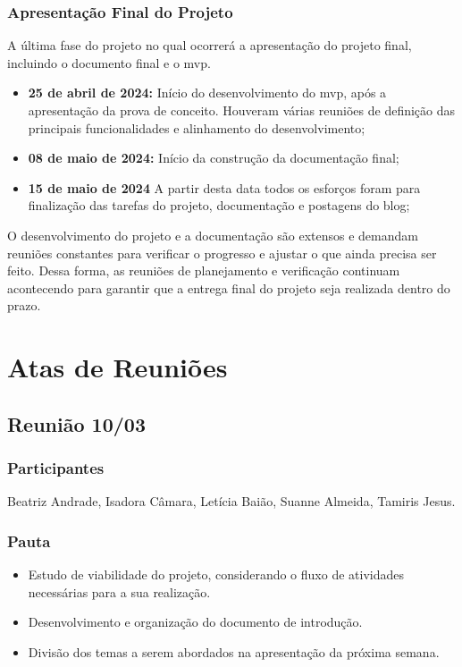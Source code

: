 \begin{apendicesenv}
\subsection*{Apresentação Final do Projeto}
A última fase do projeto no qual ocorrerá a apresentação do projeto final, incluindo o documento final e o \ac{mvp}.
\begin{itemize}
        \item \textbf{25 de abril de 2024:}
         Início do desenvolvimento do \ac{mvp}, após a apresentação da prova de conceito. Houveram várias reuniões de definição das principais funcionalidades e alinhamento do desenvolvimento;
        \item \textbf{08 de maio de 2024:}
         Início da construção da documentação final;
        \item \textbf{15 de maio de 2024}
         A partir desta data todos os esforços foram para finalização das tarefas do projeto, documentação e postagens do blog;
     \end{itemize}
O desenvolvimento do projeto e a documentação são extensos e demandam reuniões constantes para verificar o progresso e ajustar o que ainda precisa ser feito. Dessa forma, as reuniões de planejamento e verificação continuam acontecendo para garantir que a entrega final do projeto seja realizada dentro do prazo.

\chapter{Atas de Reuniões}
\label{apendice_j}

\section*{Reunião 10/03}

\subsection*{Participantes}
Beatriz Andrade, Isadora Câmara, Letícia Baião, Suanne Almeida, Tamiris Jesus.

\subsection*{Pauta}
\begin{itemize}
    \item Estudo de viabilidade do projeto, considerando o fluxo de atividades necessárias para a sua realização.
    \item Desenvolvimento e organização do documento de introdução.
    \item Divisão dos temas a serem abordados na apresentação da próxima semana.
\end{itemize}


\end{apendicesenv}
